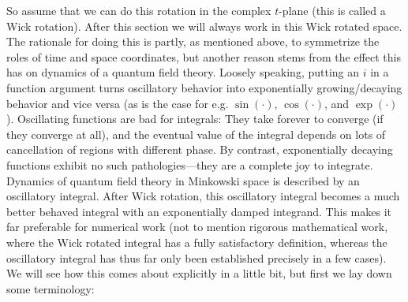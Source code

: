 \documentclass[9pt,twocolumn,twoside]{article}
\begin{document}
So assume that we can do this rotation in the complex $t$-plane (this is called a Wick rotation).  After this section we will always work in this Wick rotated space.  The rationale for doing this is partly, as mentioned above, to symmetrize the roles of time and space coordinates, but another reason stems from the effect this has on dynamics of a quantum field theory.  Loosely speaking, putting an $i$ in a function argument turns oscillatory behavior into exponentially growing/decaying behavior and vice versa (as is the case for e.g. $\sin(\cdot)$, $\cos(\cdot)$, and $\exp(\cdot)$).  Oscillating functions are bad for integrals: They take forever to converge (if they converge at all), and the eventual value of the integral depends on lots of cancellation of regions with different phase.  By contrast, exponentially decaying functions exhibit no such pathologies---they are a complete joy to integrate.  Dynamics of quantum field theory in Minkowski space is described by an oscillatory integral.  After Wick rotation, this oscillatory integral becomes a much better behaved integral with an exponentially damped integrand.  This makes it far preferable for numerical work (not to mention rigorous mathematical work, where the Wick rotated integral has a fully satisfactory definition, whereas the oscillatory integral has thus far only been established precisely in a few cases).  We will see how this comes about explicitly in a little bit, but first we lay down some terminology:

\end{document}
